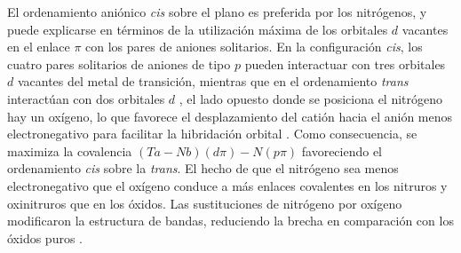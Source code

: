 El ordenamiento aniónico \emph{cis} sobre el plano es preferida por los nitrógenos, y puede explicarse en términos de la utilización máxima de los orbitales $d$ vacantes en el enlace $\pi$ con los pares de aniones solitarios. En la configuración \emph{cis}, los cuatro pares solitarios de aniones de tipo $p$ pueden interactuar con tres orbitales $d$ vacantes del metal de transición, mientras que en el ordenamiento \emph{trans} interactúan con dos orbitales $d$ \cite{Fuertes2012ChemistryPerovskites}, el lado opuesto donde se posiciona el nitrógeno hay un oxígeno, lo que favorece el desplazamiento del catión hacia el anión menos electronegativo para facilitar la hibridación orbital \cite{Harada2019PredictingOrder}. Como consecuencia, se maximiza la covalencia $(Ta-Nb)(d\pi)-N(p\pi)$ favoreciendo el ordenamiento \emph{cis} sobre la \emph{trans}\cite{Yang2011,Ebbinghaus2004PowderK}. El hecho de que el nitrógeno sea menos electronegativo que el oxígeno conduce a más enlaces covalentes en los nitruros y oxinitruros que en los óxidos. Las sustituciones de nitrógeno por oxígeno modificaron la estructura de bandas, reduciendo la brecha en comparación con los óxidos puros \cite{Diot1999CrystalN}. 











